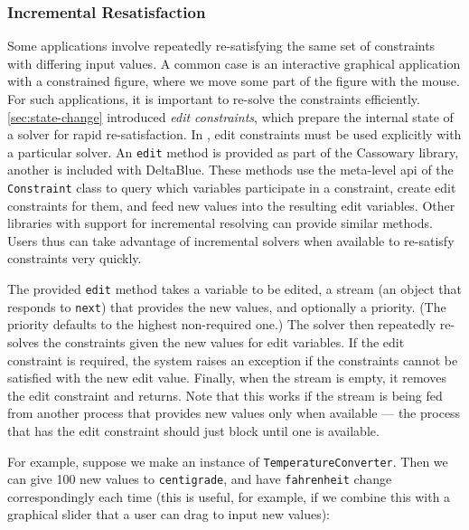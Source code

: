 \subsubsection{Incremental Resatisfaction}
Some applications involve repeatedly re-satisfying the same set of
constraints with differing input values.  A common case is an
interactive graphical application with a constrained figure, where we
move some part of the figure with the mouse.  For such applications,
it is important to re-solve the constraints
efficiently. \autoref{sec:state-change} introduced \emph{edit
  constraints}, which prepare the internal state of a solver for rapid
re-satisfaction.
In \toolname, edit constraints must be used explicitly with a particular
solver. An \lstinline{edit} method is provided as part of the
Cassowary library, another is included with DeltaBlue.  These methods
use the meta-level \ac{api} of the \lstinline{Constraint} class to
query which variables participate in a constraint, create edit
constraints for them, and feed new values into the resulting edit
variables.  Other libraries with support for incremental resolving can
provide similar methods. Users thus can take advantage of incremental
solvers when available to re-satisfy constraints very quickly.

The provided \lstinline{edit} method takes a variable to be edited, a
stream (an object that responds to \lstinline{next}) that provides the
new values, and optionally a priority.  (The priority defaults to the
highest non-required one.)  The solver then repeatedly re-solves 
the constraints given the new values for edit variables.  If the edit
constraint is required, the system
raises an exception if the constraints cannot be satisfied with the
new edit value.  Finally, when the
stream is empty, it removes the edit constraint and returns.  Note
that this works if the stream is being fed from another process that
provides new values only when available --- the process that has the
edit constraint should just block until one is available.

For example, suppose we make an instance of
\lstinline{TemperatureConverter}.  Then we can give 100 new values to
\lstinline{centigrade}, and have \lstinline{fahrenheit} change
correspondingly each time (this is useful, for example, if we combine
this with a graphical slider that a user can drag to input new
values):

